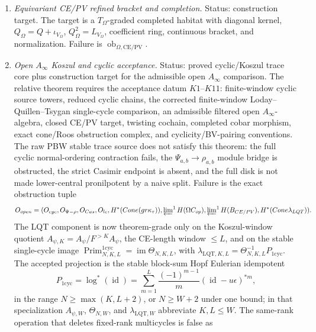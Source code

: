 \begin{enumerate}
  \item \emph{Equivariant CE/PV refined bracket and completion.}
  Status: construction target.  The target is a
  \(T_\Omega\)-graded completed habitat with diagonal kernel,
  \(Q_\Omega=Q+\iota_{V_\Omega}\), \(Q_\Omega^2=L_{V_\Omega}\),
  coefficient ring, continuous bracket, and normalization.  Failure is
  \(\operatorname{ob}_{\Omega,\mathrm{CE/PV}}\).

  \item \emph{Open \(A_\infty\) Koszul and cyclic acceptance.}
  Status: proved cyclic/Koszul trace core plus construction target for
  the admissible open \(A_\infty\) comparison.  The relative theorem
  requires the acceptance datum \(K1\)--\(K11\): finite-window cyclic
  source towers, reduced cyclic chains, the corrected finite-window
  Loday--Quillen--Tsygan single-cycle comparison, an admissible
  filtered open \(A_\infty\)-algebra,
  closed CE/PV target, twisting cochain, completed cobar morphism,
  exact cone/Roos obstruction complex, and cyclicity/BV-pairing
  conventions.  The raw PBW stable trace source does not satisfy this
  theorem: the full cyclic normal-ordering contraction fails, the
  \(\Psi_{a,b}\to\rho_{a,b}\) module bridge is obstructed, the strict
  Casimir endpoint is absent, and the full disk is not made
  lower-central pronilpotent by a naive split.  Failure is the exact
  obstruction tuple
  \[
    \mathcal O_{\mathrm{open}}
    =
    (\mathcal O_{\mathrm{cyc}},
     \mathcal O_{\Psi-\rho},
     \mathcal O_{\mathrm{Cas}},
     \mathcal O_{\mathrm{lc}},
     H^*(\operatorname{Cone}(\operatorname{gr}\kappa_{\tau})),
     \varprojlim\nolimits^1H(\Omega C_{\mathrm{op}}),
     \varprojlim\nolimits^1H(B_{\mathrm{CE/PV}}),
     H^*(\operatorname{Cone}\lambda_{\mathrm{LQT}})).
  \]
  The LQT component is now theorem-grade only on the Koszul-window
  quotient \(A_{\psi,K}=A_\psi/F^{>K}A_\psi\), the CE-length window
  \(\le L\), and on the stable
  single-cycle image
  \(\operatorname{Prim}^{1\mathrm{cyc}}_{N,K,L}
  =\operatorname{im}\Theta_{N,K,L}\),
  with
  \(\lambda_{\mathrm{LQT},K,L}
  =\Theta_{N,K,L}^{-1}P_{1\mathrm{cyc}}\).
  The accepted projection is the stable block-sum Hopf Eulerian
  idempotent
  \[
    P_{1\mathrm{cyc}}
    =
    \log^*(\operatorname{id})
    =
    \sum_{m=1}^{L}\frac{(-1)^{m-1}}{m}
    (\operatorname{id}-u\epsilon)^{*m},
  \]
  in the range \(N\geq\max(K,L+2)\), or \(N\geq W+2\) under one bound;
  in that specialization \(A_{\psi,W}\), \(\Theta_{N,W}\), and
  \(\lambda_{\mathrm{LQT},W}\) abbreviate \(K,L\le W\).
  The same-rank operation that deletes fixed-rank multicycles is false as

\end{enumerate}
